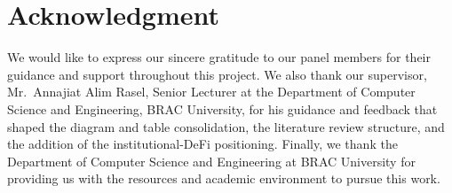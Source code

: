 \documentclass[12pt,a4paper]{report}
\begin{document}
\newpage
\thispagestyle{empty}

\chapter*{Acknowledgment}
{}

We would like to express our sincere gratitude to our panel members for their guidance and support throughout this project. We also thank our supervisor, Mr.\ Annajiat Alim Rasel, Senior Lecturer at the Department of Computer Science and Engineering, BRAC University, for his guidance and feedback that shaped the diagram and table consolidation, the literature review structure, and the addition of the institutional-DeFi positioning. Finally, we thank the Department of Computer Science and Engineering at BRAC University for providing us with the resources and academic environment to pursue this work.

\newpage
\setcounter{page}{1}
\tableofcontents
\newpage
{}
{}
\begingroup
\let\oldnumberline\numberline
\renewcommand{\numberline}[1]{\oldnumberline{#1}\hspace{0.75em}}
\listoftables
\endgroup
\newpage
{}
{}
\begingroup
\let\oldnumberline\numberline
\renewcommand{\numberline}[1]{\oldnumberline{#1}\hspace{0.75em}}
\listoffigures
\endgroup
\newpage
\end{document}
